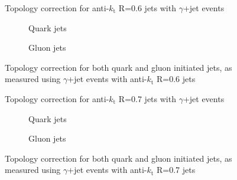 \clearpage
\begin{figure}[!ht]
 \centering
 \caption[Topology correction for anti-$k_{\mathrm t}$ R=0.6 jets with $\gamma$+jet events]
 {\small Topology correction for anti-$k_{\mathrm t}$ R=0.6 jets with $\gamma$+jet events}
 \label{plot:GJetTopoCorr6App}
\end{figure}

\begin{figure}[!ht]
 \centering
 \begin{subfigure}{.5\textwidth}
  \centering
  \caption{Quark jets}
 \end{subfigure}%
 \begin{subfigure}{.5\textwidth}
  \centering
  \caption{Gluon jets}
 \end{subfigure}
 \caption[Quark/gluon jet topology correction, anti-$k_{\mathrm t}$ R=0.6, $\gamma$+jet]
 {\small Topology correction for both quark and gluon initiated jets, as measured using $\gamma$+jet events with anti-$k_{\mathrm t}$ R=0.6 jets}
 \label{plot:GJetTopoCorrFlav6App}
\end{figure}

\clearpage
\begin{figure}[!ht]
 \centering
 \caption[Topology correction for anti-$k_{\mathrm t}$ R=0.7 jets with $\gamma$+jet events]
 {\small Topology correction for anti-$k_{\mathrm t}$ R=0.7 jets with $\gamma$+jet events}
 \label{plot:GJetTopoCorr7App}
\end{figure}

\begin{figure}[!ht]
 \centering
 \begin{subfigure}{.5\textwidth}
  \centering
  \caption{Quark jets}
 \end{subfigure}%
 \begin{subfigure}{.5\textwidth}
  \centering
  \caption{Gluon jets}
 \end{subfigure}
 \caption[Quark/gluon jet topology correction, anti-$k_{\mathrm t}$ R=0.7, $\gamma$+jet]
 {\small Topology correction for both quark and gluon initiated jets, as measured using $\gamma$+jet events with anti-$k_{\mathrm t}$ R=0.7 jets}
 \label{plot:GJetTopoCorrFlav7App}
\end{figure}

